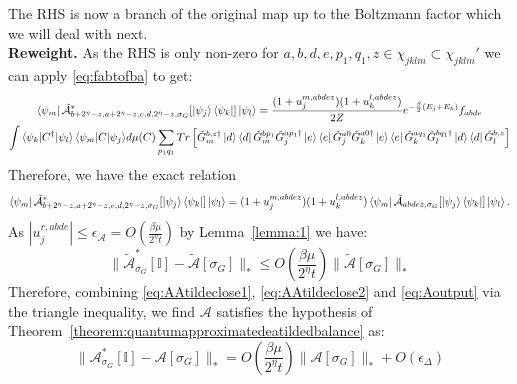 \documentclass[aps,floatfix,10pt,amssymb,amsfont,amsmath,superscriptaddress,float,nofootinbib,longbibliography,nobalancelastpage,twocolumn]{revtex4-2}
\begin{document}
The RHS is now a branch of the original map up to the Boltzmann factor which we will deal with next.\\
\textbf{Reweight.} As the RHS is only non-zero for $a,b,d,e,p_1,q_1,z \in \chi_{jklm} \subset \chi_{jklm}'$ we can apply \eqref{eq:fabtofba} to get:
\begin{multline}
\bra{\psi_m}\tilde{\mathcal{A}}^*_{b+2^{\eta}-z,a+2^{\eta}-z,e,d,2^{\eta}-z,\sigma_G}[\ket{\psi_j}\bra{\psi_k}]\ket{\psi_l} 
   = \frac{(1+u_j^{m,abdez})(1+u_k^{l,abdez})}{2Z}   e^{-\frac{\beta}{2}(E_j+E_k)}{f_{abde}}  \\\int {\braket{\psi_k|C^{\dagger}|\psi_l}\braket{\psi_m|C|\psi_j}} d\mu(C)\sum_{p_1q_1}Tr\left[ {\tilde G_m^{b, z\dagger}\ket{d}\bra{d}\tilde G_m^{bp_1}} {\tilde G^{ap_1\dagger}_j\ket{e}\bra{e}\tilde G^{a0}_j } \tilde G^{a0\dagger}_k\ket{e}\bra{e}\tilde G^{aq_1}_k \tilde G_l^{bq_1\dagger}\ket{d}\bra{d}\tilde G_l^{b,z}\right]
\end{multline}
Therefore, we have the exact relation
\begin{equation}
  \bra{\psi_m}\tilde{\mathcal{A}}^*_{b+2^{\eta}-z,a+2^{\eta}-z,e,d,2^{\eta}-z,\sigma_G}[\ket{\psi_j}\bra{\psi_k}]\ket{\psi_l} 
   =(1+u_j^{m,abdez})(1+u_k^{l,abdez})\bra{\psi_m}\tilde{\mathcal{A}}_{abdez,\sigma_G}[\ket{\psi_j}\bra{\psi_k}]\ket{\psi_l}.
\end{equation}
As $|u_j^{r,abde}| \leq \epsilon_{\mathcal{A}} = O(\frac{\beta \mu}{2^{\eta}t})$ by Lemma~\ref{lemma:1}  we have:
\begin{equation}
    \|\tilde{\mathcal{A}}^*_{\sigma_G}[\mathbb{I}] - \tilde{\mathcal{A}}[\sigma_G]\|_* \leq O\left(\frac{\beta \mu}{2^{\eta}t}\right)\|\tilde{\mathcal{A}}[\sigma_G]\|_*
    \label{eq:Aoutput}
\end{equation}
Therefore, combining \eqref{eq:AAtildeclose1}, \eqref{eq:AAtildeclose2} and \eqref{eq:Aoutput} via the triangle inequality, we find $\mathcal{A}$ satisfies the hypothesis of Theorem~\ref{theorem:quantumapproximatedeatildedbalance} as:
\begin{equation}
    \|\mathcal{A}^*_{\sigma_G}[\mathbb{I}] - \mathcal{A}[\sigma_G]\|_* = O\!\left(\frac{\beta\mu}{2^{\eta}t}\right)\|\mathcal{A}[\sigma_G]\|_* + O\!\left(\epsilon_{\Delta}\right)
\end{equation}
\end{document}
